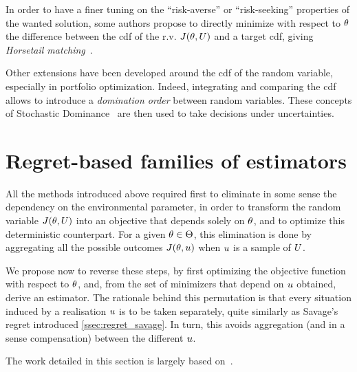 \documentclass[../../Main_ManuscritThese.tex]{subfiles}
\newcommand\imgpath{/home/victor/acadwriting/Manuscrit/Text/Chapter3/img/}
\begin{document}
In order to have a finer tuning on the ``risk-averse'' or
``risk-seeking'' properties of the wanted solution, some authors
propose to directly minimize with respect to $\theta$ the difference
between the cdf of the r.v. $J(\theta, U)$ and a target cdf, giving
\emph{Horsetail
  matching}~\cite{cook_extending_2017,cook_effective_2018}.

Other extensions have been developed around the cdf of the random
variable, especially in portfolio optimization. Indeed, integrating
and comparing the cdf allows to introduce a \emph{domination order}
between random variables. These concepts of Stochastic
Dominance~\cite{ogryczak_stochastic_1997} are then used to take
decisions under uncertainties.


\section{Regret-based families of estimators}
\label{sec:rr_family}
All the methods introduced above required first to eliminate in some
sense the dependency on the environmental parameter, in order to
transform the random variable $J(\theta, U)$ into an objective that
depends solely on $\theta$, and to optimize this deterministic
counterpart.  For a given $\theta\in\Theta$, this elimination is done by
aggregating all the possible outcomes $J(\theta, u)$ when $u$ is a
sample of $U$.


We propose now to reverse these steps, by first optimizing the
objective function with respect to $\theta$, and, from the set of
minimizers that depend on $u$ obtained, derive an estimator. The
rationale behind this permutation is that every situation induced by a
realisation $u$ is to be taken separately, quite similarly as
Savage's regret introduced \cref{ssec:regret_savage}.  In turn, this
avoids aggregation (and in a sense compensation) between the different
$u$.

The work detailed in this section is largely based
on~\cite{trappler_robust_2020}.

%   
\end{document}
